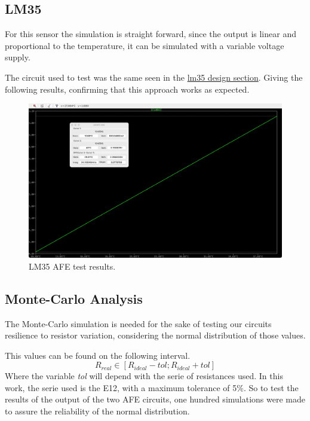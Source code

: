 \documentclass[12pt]{article}
\begin{document}
\subsection{LM35}

    For this sensor the simulation is straight forward, since the output is linear and proportional to the temperature, 
    it can be simulated with a variable voltage supply. 
    
    The circuit used to test was the same seen in the \hyperref[AFELM35]{lm35 design section}.
    Giving the following results, confirming that this approach works as expected. 
    
    \begin{figure}[H] 
        \centering
        \includegraphics*[scale = 0.15]{images/LM35AFERes.jpeg}
        \caption{LM35 AFE test results.}
        \label{LM35AFERes}
    \end{figure}

\subsection{Monte-Carlo Analysis} 
    
    The Monte-Carlo simulation is needed for the sake of testing our circuits resilience to resistor variation, considering 
    the normal distribution of those values. 

    This values can be found on the following interval.
    \begin{equation}
        R_{real} \in [R_{ideal} - tol; R_{ideal} + tol] 
    \end{equation}
    Where the variable \textit{tol} will depend with the serie of resistances used. 
    In this work, the serie used is the E12, with a maximum tolerance of 5\%. So to test the results of
    the output of the two AFE circuits, one hundred simulations were made to assure the reliability of the normal distribution.
\end{document}
